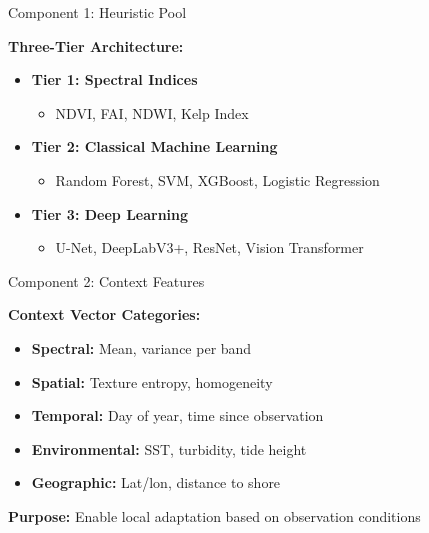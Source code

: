 \documentclass[10pt,xcolor={table,dvipsnames},t]{beamer}
\begin{document}
\begin{frame}{Component 1: Heuristic Pool}

\textbf{Three-Tier Architecture:}

\begin{itemize}
  \item \textbf{Tier 1: Spectral Indices}
  \begin{itemize}
    \item NDVI, FAI, NDWI, Kelp Index
  \end{itemize}

  \item \textbf{Tier 2: Classical Machine Learning}
  \begin{itemize}
    \item Random Forest, SVM, XGBoost, Logistic Regression
  \end{itemize}

  \item \textbf{Tier 3: Deep Learning}
  \begin{itemize}
    \item U-Net, DeepLabV3+, ResNet, Vision Transformer
  \end{itemize}
\end{itemize}

\end{frame}

\begin{frame}{Component 2: Context Features}

\textbf{Context Vector Categories:}
\begin{itemize}
  \item \textbf{Spectral:} Mean, variance per band
  \item \textbf{Spatial:} Texture entropy, homogeneity
  \item \textbf{Temporal:} Day of year, time since observation
  \item \textbf{Environmental:} SST, turbidity, tide height
  \item \textbf{Geographic:} Lat/lon, distance to shore
\end{itemize}

\vspace{0.5em}
\textbf{Purpose:} Enable local adaptation based on observation conditions

\end{frame}
\end{document}
